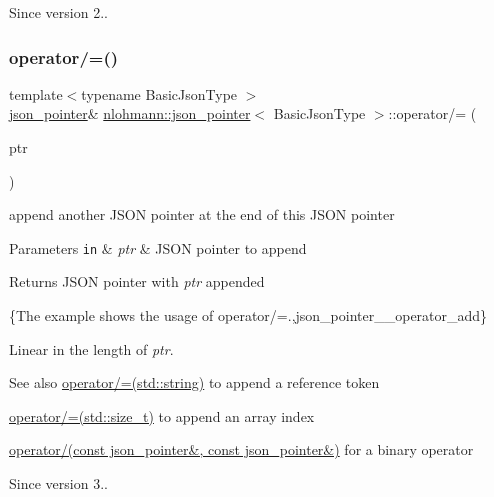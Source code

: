\begin{DoxySince}{Since}
version 2.. 
\end{DoxySince}
\mbox{\label{classnlohmann_1_1json__pointer_a7395bd0af29ac23fd3f21543c935cdfa}} 
\subsubsection{\texorpdfstring{operator/=()}{operator/=()}\hspace{0.1cm}{\footnotesize\ttfamily [1/3]}}
{\footnotesize\ttfamily template$<$typename Basic\+Json\+Type $>$ \\
\hyperlink{classnlohmann_1_1json__pointer}{json\+\_\+pointer}\& \hyperlink{classnlohmann_1_1json__pointer}{nlohmann\+::json\+\_\+pointer}$<$ Basic\+Json\+Type $>$\+::operator/= (\begin{DoxyParamCaption}\item[{const \hyperlink{classnlohmann_1_1json__pointer}{json\+\_\+pointer}$<$ Basic\+Json\+Type $>$ \&}]{ptr }\end{DoxyParamCaption})\hspace{0.3cm}{\ttfamily [inline]}}



append another J\+S\+ON pointer at the end of this J\+S\+ON pointer 


\begin{DoxyParams}[1]{Parameters}
\mbox{\tt in}  & {\em ptr} & J\+S\+ON pointer to append \\
\hline
\end{DoxyParams}
\begin{DoxyReturn}{Returns}
J\+S\+ON pointer with {\itshape ptr} appended
\end{DoxyReturn}
\{The example shows the usage of {\ttfamily operator/=}.,json\+\_\+pointer\+\_\+\+\_\+operator\+\_\+add\}

Linear in the length of {\itshape ptr}.

\begin{DoxySeeAlso}{See also}
\hyperlink{classnlohmann_1_1json__pointer_abdd21567b2b1d69329af0f520335e68b}{operator/=(std\+::string)} to append a reference token 

\hyperlink{classnlohmann_1_1json__pointer_a64c8401529131bad1e486d91d703795f}{operator/=(std\+::size\+\_\+t)} to append an array index 

\hyperlink{classnlohmann_1_1json__pointer_a90a11fe6c7f37b1746a3ff9cb24b0d53}{operator/(const json\+\_\+pointer\&, const json\+\_\+pointer\&)} for a binary operator
\end{DoxySeeAlso}
\begin{DoxySince}{Since}
version 3.. 
\end{DoxySince}
\mbox{\label{classnlohmann_1_1json__pointer_abdd21567b2b1d69329af0f520335e68b}} 
